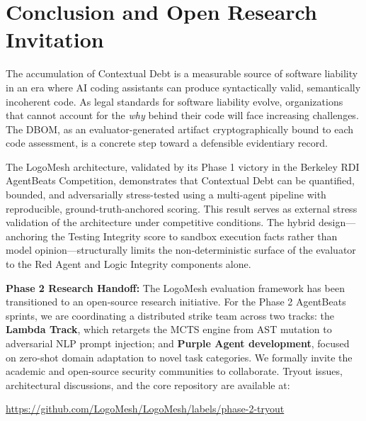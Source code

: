 \documentclass[11pt, a4paper]{article}
\begin{document}
\section{Conclusion and Open Research Invitation}

The accumulation of Contextual Debt is a measurable source of software liability in an era where AI coding assistants can produce syntactically valid, semantically incoherent code. As legal standards for software liability evolve, organizations that cannot account for the \emph{why} behind their code will face increasing challenges. The DBOM, as an evaluator-generated artifact cryptographically bound to each code assessment, is a concrete step toward a defensible evidentiary record.

The LogoMesh architecture, validated by its Phase 1 victory in the Berkeley RDI AgentBeats Competition, demonstrates that Contextual Debt can be quantified, bounded, and adversarially stress-tested using a multi-agent pipeline with reproducible, ground-truth-anchored scoring. This result serves as external stress validation of the architecture under competitive conditions. The hybrid design—anchoring the Testing Integrity score to sandbox execution facts rather than model opinion—structurally limits the non-deterministic surface of the evaluator to the Red Agent and Logic Integrity components alone.

\textbf{Phase 2 Research Handoff:} The LogoMesh evaluation framework has been transitioned to an open-source research initiative. For the Phase 2 AgentBeats sprints, we are coordinating a distributed strike team across two tracks: the \textbf{Lambda Track}, which retargets the MCTS engine from AST mutation to adversarial NLP prompt injection; and \textbf{Purple Agent development}, focused on zero-shot domain adaptation to novel task categories. We formally invite the academic and open-source security communities to collaborate. Tryout issues, architectural discussions, and the core repository are available at:

\begin{center}
\url{https://github.com/LogoMesh/LogoMesh/labels/phase-2-tryout}
\end{center}
\end{document}
